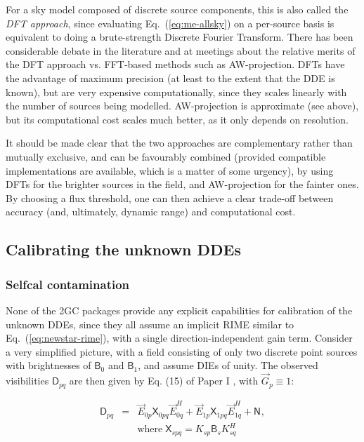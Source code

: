 \documentclass{aa}
\newcommand{\herm}{H}
\newcommand{\jones}[2]{\vec {#1}_{#2}}
\newcommand{\jonesT}[2]{\vec {#1}^{\herm}_{#2}}
\newcommand{\coh}[2]{\mathsf{{#1}}_{{#2}}}
\begin{document}
For a sky model composed of discrete source components, this is also called the \emph{DFT approach}, since evaluating Eq.~(\ref{eq:me-allsky}) on a per-source basis is equivalent to doing a brute-strength Discrete Fourier Transform. There has been considerable debate in the literature and at meetings about the relative merits of the DFT approach vs. FFT-based methods such as AW-projection. DFTs have the advantage of maximum precision (at least to the extent that the DDE is known), but are very expensive computationally, since they scales linearly with the number of sources being modelled. AW-projection is approximate (see above), but its computational cost scales much better, as it only depends on resolution.

It should be made clear that the two approaches are complementary rather than mutually exclusive, and can be favourably combined (provided compatible implementations are available, which is a matter of some urgency), by using DFTs for the brighter sources in the field, and AW-projection for the fainter ones. By choosing a flux threshold, one can then achieve a clear trade-off between accuracy (and, ultimately, dynamic range) and computational cost. 

\subsection{Calibrating the unknown DDEs}

\subsubsection{Selfcal contamination}

None of the 2GC packages provide any explicit capabilities for calibration of the unknown DDEs, since they all assume an implicit RIME similar to Eq.~(\ref{eq:newstar-rime}), with a single direction-independent gain term. Consider a very simplified picture, with a field consisting of only two discrete point sources with brightnesses of $\coh{B}{0}$ and $\coh{B}{1}$, and assume DIEs of unity. The observed visibilities $\coh{D}{pq}$ are then given by Eq. (15) of Paper I \citep{RRIME1}, with $\jones{G}{p}\equiv1$:

\begin{eqnarray}\label{eq:selfcal-dpq}
\coh{D}{pq} & = & \jones{E}{0p} \coh{X}{0pq} \jonesT{E}{0q} + \jones{E}{1p} \coh{X}{1pq} \jonesT{E}{1q} + \coh{N}{}, \\
\nonumber && \mathrm{where}\; \coh{X}{spq} = K_{sp} \coh{B}{s} K^\herm_{sq}
\end{eqnarray}  
\end{document}
